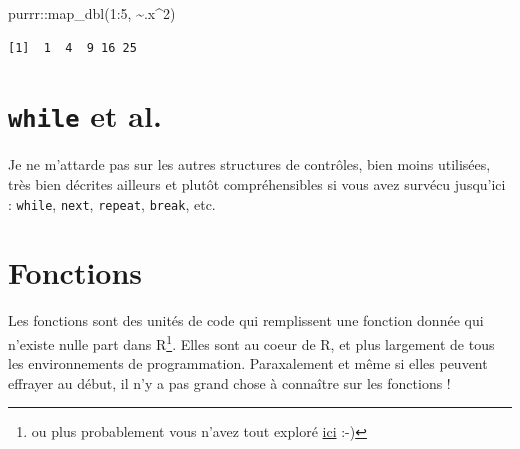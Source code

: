 \documentclass[
  letterpaper,
  DIV=11,
  numbers=noendperiod]{scrreprt}
\newenvironment{Shaded}{\begin{snugshade}}{\end{snugshade}}
\newcommand{\DecValTok}[1]{\textcolor[rgb]{0.68,0.00,0.00}{#1}}
\newcommand{\FunctionTok}[1]{\textcolor[rgb]{0.28,0.35,0.67}{#1}}
\newcommand{\NormalTok}[1]{\textcolor[rgb]{0.00,0.23,0.31}{#1}}
\newcommand{\SpecialCharTok}[1]{\textcolor[rgb]{0.37,0.37,0.37}{#1}}
\begin{document}
\begin{Shaded}
\begin{Highlighting}[]
\NormalTok{purrr}\SpecialCharTok{::}\FunctionTok{map\_dbl}\NormalTok{(}\DecValTok{1}\SpecialCharTok{:}\DecValTok{5}\NormalTok{, }\SpecialCharTok{\textasciitilde{}}\NormalTok{.x}\SpecialCharTok{\^{}}\DecValTok{2}\NormalTok{)}
\end{Highlighting}
\end{Shaded}

\begin{verbatim}
[1]  1  4  9 16 25
\end{verbatim}

\hypertarget{while-et-al.}{%
\section{\texorpdfstring{\texttt{while} et
al.}{while et al.}}\label{while-et-al.}}

Je ne m'attarde pas sur les autres structures de contrôles, bien moins
utilisées, très bien décrites ailleurs et plutôt compréhensibles si vous
avez survécu jusqu'ici : \texttt{while}, \texttt{next}, \texttt{repeat},
\texttt{break}, etc.

\hypertarget{fonctions-1}{%
\section{Fonctions}\label{fonctions-1}}

Les fonctions sont des unités de code qui remplissent une fonction
donnée qui n'existe nulle part dans R\footnote{ou plus probablement vous
  n'avez tout exploré
  \href{https://cran.r-project.org/web/packages/available_packages_by_name.html}{ici}
  :-)}. Elles sont au coeur de R, et plus largement de tous les
environnements de programmation. Paraxalement et même si elles peuvent
effrayer au début, il n'y a pas grand chose à connaître sur les
fonctions !
\end{document}
